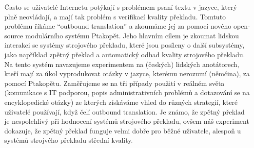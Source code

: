 \documentclass[12pt]{report}
\begin{document}

Často se uživatelé Internetu potýkají s problémem psaní textu v jazyce, který plně neovládají, a mají tak problém s verifikací kvality překladu. Tomtuto problému říkáme ``outbound translation'' a zkoumáme jej za pomocí nového open-source modulárního systému Ptakopět. Jeho hlavním cílem je zkoumat lidskou interakci se systémy strojového překladu, které jsou posíleny o další subsystémy, jako například zpětný překlad a automatický odhad kvality strojového překladu. Na tento systém navazujeme experimentem na (českých) lidských anotátorech, kteří mají za úkol vyprodukovat otázky v jazyce, kterému nerozumí (němčina), za pomocí Ptakopětu. Zaměřujeme se na tři případy použití v reálném světa (komunikace s IT podporou, popis administrativních problémů a dotazování se na encyklopedické otázky) ze kterých získáváme vhled do různých strategií, které uživatelé používají, když čelí outbound translation. Je známo, že zpětný překlad je nespolehlivý při hodnocení systémů strojového překladu, ovšem náš experiment dokazuje, že zpětný překlad funguje velmi dobře pro běžné uživatele, alespoň u systémů strojvého překladu střední kvality.
\end{document}
